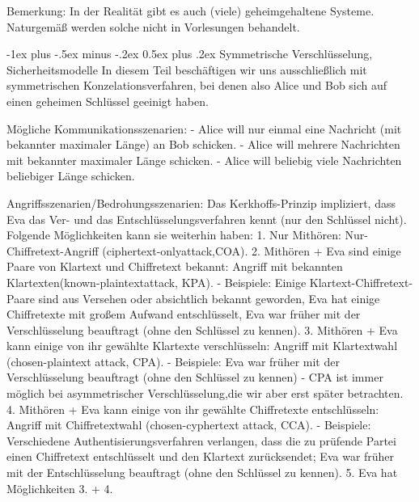 \documentclass[a4paper]{article}
\makeatletter
\renewcommand{\section}{\@startsection{section}{1}{0mm}%
 {-1ex plus -.5ex minus -.2ex}%
 {0.5ex plus .2ex}%
 {\normalfont\large\bfseries}}
\makeatother
\begin{document}
\begin{multicols}{3}
    Bemerkung: In der Realität gibt es auch (viele) geheimgehaltene Systeme. Naturgemäß werden solche nicht in Vorlesungen behandelt.

    \section{Symmetrische Verschlüsselung, Sicherheitsmodelle}
    In diesem Teil beschäftigen wir uns ausschließlich mit symmetrischen Konzelationsverfahren, bei denen also Alice und Bob sich auf einen geheimen Schlüssel geeinigt haben.

    Mögliche Kommunikationsszenarien:
    - Alice will nur einmal eine Nachricht (mit bekannter maximaler Länge) an Bob schicken.
    - Alice will mehrere Nachrichten mit bekannter maximaler Länge schicken.
    - Alice will beliebig viele Nachrichten beliebiger Länge schicken.

    Angriffsszenarien/Bedrohungsszenarien:
    Das Kerkhoffs-Prinzip impliziert, dass Eva das Ver- und das Entschlüsselungsverfahren kennt (nur den Schlüssel nicht). Folgende Möglichkeiten kann sie weiterhin haben:
    1. Nur Mithören: Nur-Chiffretext-Angriff (ciphertext-onlyattack,COA).
    2. Mithören + Eva sind einige Paare von Klartext und Chiffretext bekannt: Angriff mit bekannten Klartexten(known-plaintextattack, KPA).
    - Beispiele: Einige Klartext-Chiffretext-Paare sind aus Versehen oder absichtlich bekannt geworden, Eva hat einige Chiffretexte mit großem Aufwand entschlüsselt, Eva war früher mit der Verschlüsselung beauftragt (ohne den Schlüssel zu kennen).
    3. Mithören + Eva kann einige von ihr gewählte Klartexte verschlüsseln: Angriff mit Klartextwahl (chosen-plaintext attack, CPA).
    - Beispiele: Eva war früher mit der Verschlüsselung beauftragt (ohne den Schlüssel zu kennen)
    - CPA ist immer möglich bei asymmetrischer Verschlüsselung,die wir aber erst später betrachten.
    4. Mithören + Eva kann einige von ihr gewählte Chiffretexte entschlüsseln: Angriff mit Chiffretextwahl (chosen-cyphertext attack, CCA).
    - Beispiele: Verschiedene Authentisierungsverfahren verlangen, dass die zu prüfende Partei einen Chiffretext entschlüsselt und den Klartext zurücksendet; Eva war früher mit der Entschlüsselung beauftragt (ohne den Schlüssel zu kennen).
    5. Eva hat Möglichkeiten 3. + 4.


\end{multicols}
\end{document}
